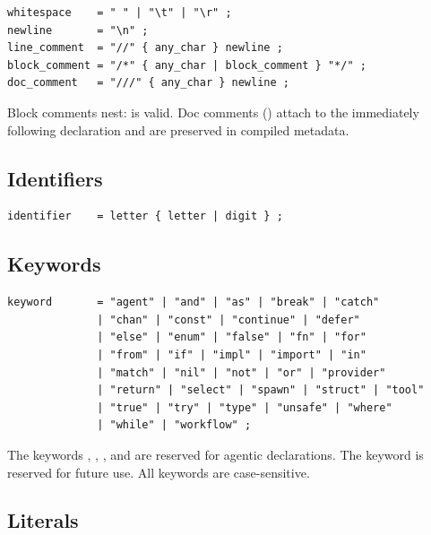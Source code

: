 \begin{lstlisting}[language=EBNF]
whitespace    = " " | "\t" | "\r" ;
newline       = "\n" ;
line_comment  = "//" { any_char } newline ;
block_comment = "/*" { any_char | block_comment } "*/" ;
doc_comment   = "///" { any_char } newline ;
\end{lstlisting}

\begin{note}
Block comments nest:  is valid. Doc comments (\code{///}) attach to the immediately following declaration and are preserved in compiled metadata.
\end{note}

\subsection{Identifiers}

\begin{lstlisting}[language=EBNF]
identifier    = letter { letter | digit } ;
\end{lstlisting}

\subsection{Keywords}

\begin{lstlisting}[language=EBNF]
keyword       = "agent" | "and" | "as" | "break" | "catch"
              | "chan" | "const" | "continue" | "defer"
              | "else" | "enum" | "false" | "fn" | "for"
              | "from" | "if" | "impl" | "import" | "in"
              | "match" | "nil" | "not" | "or" | "provider"
              | "return" | "select" | "spawn" | "struct" | "tool"
              | "true" | "try" | "type" | "unsafe" | "where"
              | "while" | "workflow" ;
\end{lstlisting}

\begin{note}
The keywords , , , and  are reserved for agentic declarations. The keyword  is reserved for future use. All keywords are case-sensitive.
\end{note}

\subsection{Literals}


